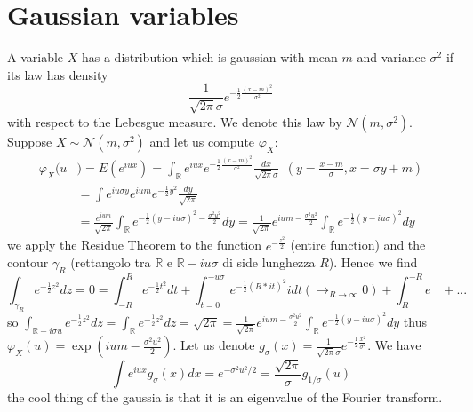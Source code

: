 \documentclass[10pt,a4paper]{book}
\newcommand{\R}{\mathbb{R}}
\theoremstyle{definition}
\begin{document}
\section{Gaussian variables}
A variable $X$ has a distribution which is gaussian with mean $m$ and variance $\sigma^2$ if its law has density
$$\frac{1}{\sqrt{2\pi}\sigma}e^{-\frac{1}{2}\frac{(x-m)^2}{\sigma^2}}$$
with respect to the Lebesgue measure. We denote this law by $\mathcal{N}(m,\sigma^2)$. Suppose $X\sim\mathcal{N}(m,\sigma^2)$ and let us compute $\varphi_X$:
\begin{align*}
\varphi_X(u&)=E(e^{iux})=\int_{\R}e^{iux}e^{-\frac{1}{2}\frac{(x-m)^2}{\sigma^2}}\frac{dx}{\sqrt{2\pi}\sigma}\,\,\,(y=\frac{x-m}{\sigma}, x=\sigma y+m)\\
&=\int e^{iu\sigma y}e^{ium}e^{-\frac{1}{2}y^2}\frac{dy}{\sqrt{2\pi}}\\
&=\frac{e^{ium}}{\sqrt{2\pi}}\int_{\R}e^{-\frac{1}{2}(y-iu\sigma)^2-\frac{\sigma^2 u^2}{2}}dy=\frac{1}{\sqrt{2\pi}}e^{ium-\frac{\sigma^2 u^2}{2}}\int_{\R}e^{-\frac{1}{2}(y-iu\sigma)^2}dy
\end{align*}
we apply the Residue Theorem to the function $e^{-\frac{z^2}{2}}$ (entire function) and the contour $\gamma_R$ (rettangolo tra $\R$ e $\R-iu\sigma$ di side lunghezza $R$). Hence we find
$$\int_{\gamma_R}e^{-\frac{1}{2}z^2}dz=0=\int_{-R}^Re^{-\frac{1}{2}t^2}dt+\int_{t=0}^{-u\sigma}e^{-\frac{1}{2}(R*it)^2}idt(\to_{R\to\infty} 0)+\int_{R}^{-R} e^{....}+...$$
so $\int_{\R-i\sigma u}e^{-\frac{1}{2}z^2}dz=\int_{\R}e^{-\frac{1}{2}z^2}dz=\sqrt{2\pi}=\frac{1}{\sqrt{2\pi}}e^{ium-\frac{\sigma^2 u^2}{2}}\int_{\R}e^{-\frac{1}{2}(y-iu\sigma)^2}dy$ thus $\varphi_X(u)=\exp(ium-\frac{\sigma^2u^2}{2})$. Let us denote $g_{\sigma}(x)=\frac{1}{\sqrt{2\pi}\sigma}e^{-\frac{1}{2}\frac{x^2}{\sigma^2}}$. We have 
$$\int e^{iux}g_{\sigma}(x)dx=e^{-\sigma^2 u^2/2}=\frac{\sqrt{2\pi}}{\sigma}g_{1/\sigma}(u)$$
the cool thing of the gaussia is that it is an eigenvalue of the Fourier transform.
\end{document}
